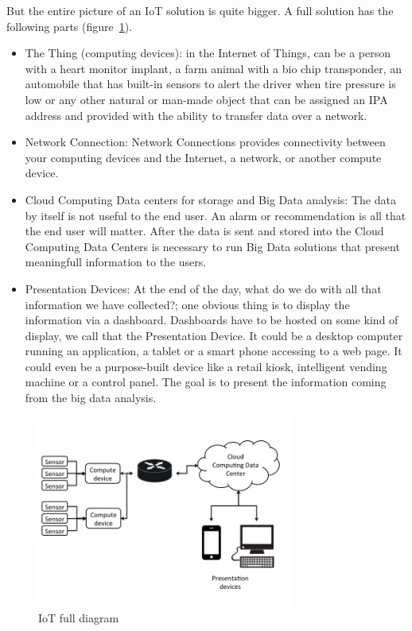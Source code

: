 But the entire picture of an IoT solution is quite bigger. A full solution has 
the following parts (figure~\ref{fig:1.1}).

\begin{itemize} 

\item The Thing (computing devices):  in the Internet of Things, can be a
person with a heart monitor implant, a farm animal with a bio chip transponder,
an automobile that has built-in sensors to alert the driver when tire pressure
is low or any other natural or man-made object that can be assigned an IPA
address and provided with the ability to transfer data over a network.

\item Network Connection: Network Connections provides connectivity between
your computing devices  and the Internet, a network, or another compute device.

\item Cloud Computing Data centers for storage and Big Data analysis: The data
by itself is not useful to the end user. An alarm or recommendation is all that
the end user will matter. After the data is sent and stored into the Cloud
Computing Data Centers is necessary to run Big Data solutions that present
meaningfull information to the users.

\item Presentation Devices: At the end of the day, what do we do with all that
information we have collected?; one obvious thing is to display the information
via a dashboard. Dashboards have to be hosted on some kind of display, we call
that the Presentation Device.  It could be a desktop computer running an
application, a tablet or a smart phone accessing to a web page. It could even
be a purpose-built device like a retail kiosk, intelligent vending machine or a
control panel. The goal is to present the information coming from the big data
analysis.

\end{itemize}

\begin{figure}[H]
\centering
\includegraphics[width=0.75\textwidth]{images/IoT_diagram.jpg}
\caption{IoT full diagram }
\label{fig:1.1}
\end{figure}

